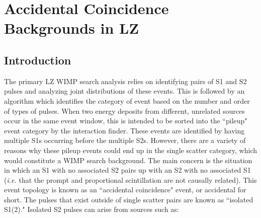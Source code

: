 \chapter{Accidental Coincidence Backgrounds in LZ}
\label{chap:accidental}
\section{Introduction}
The primary LZ WIMP search analysis relies on identifying pairs of S1 and S2 pulses and analyzing joint distributions of these events.
This is followed by an algorithm which identifies the category of event based on the number and order of types of pulses.
When two energy deposits from different, unrelated sources occur in the same event window, this is intended to be sorted into the ``pileup" event category by the interaction finder.
These events are identified by having multiple S1s occurring before the multiple S2s. 
However, there are a variety of reasons why these pileup events could end up in the single scatter category, which would constitute a WIMP search background.
The main concern is the situation in which an S1 with no associated S2 pairs up with an S2 with no associated S1 (\textit{i.e.} that the prompt and proportional scintillation are not causally related). 
This event topology is known as an ``accidental coincidence" event, or accidental for short.
The pulses that exist outside of single scatter pairs are known as ``isolated S1(2)."
Isolated S2 pulses can arise from sources such as:

